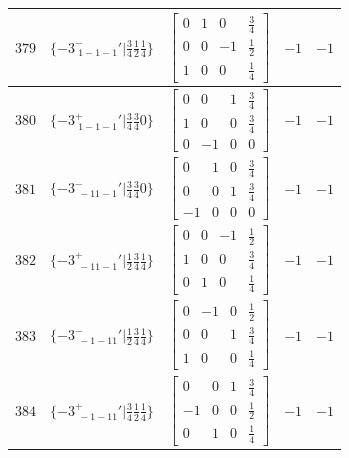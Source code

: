 \documentclass[fleqn,8pt]{jsarticle}
\begin{document}
\begin{longtable}{ccccc}
$ 379 $ & $ \{-3^{-}_{\,\,1-1-1}{}'|\frac{3}{4} \frac{1}{2} \frac{1}{4}\} $ & $ \begin{bmatrix} 0 & 1 & 0 & \frac{3}{4} \\ 0 & 0 & -1 & \frac{1}{2} \\ 1 & 0 & 0 & \frac{1}{4} \end{bmatrix} $ & $ -1 $ & $ -1 $ \\ \hline
$ 380 $ & $ \{-3^{+}_{\,\,1-1-1}{}'|\frac{3}{4} \frac{3}{4} 0\} $ & $ \begin{bmatrix} 0 & 0 & 1 & \frac{3}{4} \\ 1 & 0 & 0 & \frac{3}{4} \\ 0 & -1 & 0 & 0 \end{bmatrix} $ & $ -1 $ & $ -1 $ \\ \hline
$ 381 $ & $ \{-3^{-}_{\,\,-11-1}{}'|\frac{3}{4} \frac{3}{4} 0\} $ & $ \begin{bmatrix} 0 & 1 & 0 & \frac{3}{4} \\ 0 & 0 & 1 & \frac{3}{4} \\ -1 & 0 & 0 & 0 \end{bmatrix} $ & $ -1 $ & $ -1 $ \\ \hline
$ 382 $ & $ \{-3^{+}_{\,\,-11-1}{}'|\frac{1}{2} \frac{3}{4} \frac{1}{4}\} $ & $ \begin{bmatrix} 0 & 0 & -1 & \frac{1}{2} \\ 1 & 0 & 0 & \frac{3}{4} \\ 0 & 1 & 0 & \frac{1}{4} \end{bmatrix} $ & $ -1 $ & $ -1 $ \\ \hline
$ 383 $ & $ \{-3^{-}_{\,\,-1-11}{}'|\frac{1}{2} \frac{3}{4} \frac{1}{4}\} $ & $ \begin{bmatrix} 0 & -1 & 0 & \frac{1}{2} \\ 0 & 0 & 1 & \frac{3}{4} \\ 1 & 0 & 0 & \frac{1}{4} \end{bmatrix} $ & $ -1 $ & $ -1 $ \\ \hline
$ 384 $ & $ \{-3^{+}_{\,\,-1-11}{}'|\frac{3}{4} \frac{1}{2} \frac{1}{4}\} $ & $ \begin{bmatrix} 0 & 0 & 1 & \frac{3}{4} \\ -1 & 0 & 0 & \frac{1}{2} \\ 0 & 1 & 0 & \frac{1}{4} \end{bmatrix} $ & $ -1 $ & $ -1 $ \\
\end{longtable}
\end{document}
